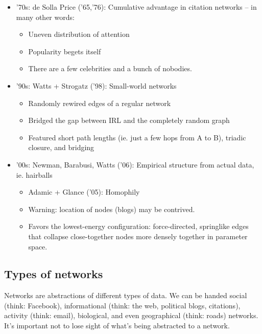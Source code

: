 \begin{itemize}
  \item '70s: de Solla Price ('65,'76): Cumulative advantage in citation networks -- in many other words:
	\begin{itemize}
		\item Uneven distribution of attention
		\item Popularity begets itself
		\item There are a few celebrities and a bunch of nobodies.
  	\end{itemize} 
  \item '90s: Watts + Strogatz ('98): Small-world networks
  	\begin{itemize}
		\item Randomly rewired edges of a regular network
		\item Bridged the gap between IRL and the completely random graph
		\item Featured short path lengths (ie. just a few hops from A to B), triadic closure, and bridging
  	\end{itemize} 
    \item '00s: Newman, Barabusi, Watts ('06): Empirical structure from actual data, ie. hairballs
    	\begin{itemize}
		\item Adamic + Glance ('05): Homophily        
		\item Warning: location of nodes (blogs) may be contrived.
		\item Favors the lowest-energy configuration: force-directed, springlike edges that collapse close-together nodes more densely together in parameter space.
  	\end{itemize} 
\end{itemize}


\subsection{Types of networks}
Networks are abstractions of different types of data. We can be handed social (think: Facebook), informational (think: the web, political blogs, citations), activity (think: email), biological, and even geographical (think: roads) networks. It's important not to lose sight of what's being abstracted to a network. 

